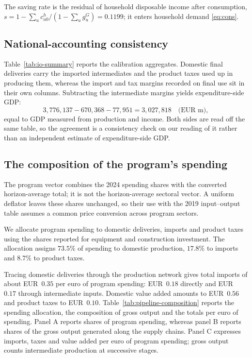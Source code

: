 {\setlength{\emergencystretch}{1.2em}%
The saving rate is the residual of household disposable income after consumption, $s=1-\sum_u c^{h}_{u0}/(1-\sum_u g^{G}_u)=0.1199$; it enters household demand \eqref{eq:cons}.\par}

\subsection{National-accounting consistency}\label{app:pipeline-checks}

Table~\ref{tab:io-summary} reports the calibration aggregates. Domestic final deliveries carry the imported intermediates and the product taxes used up in producing them, whereas the import and tax margins recorded on final use sit in their own columns. Subtracting the intermediate margins yields expenditure-side GDP:
\[
3{,}776{,}137 - 670{,}368 - 77{,}951 = 3{,}027{,}818
\quad\text{(EUR m)},
\]
equal to GDP measured from production and income. Both sides are read off the
same table, so the agreement is a consistency check on our reading of it rather
than an independent estimate of expenditure-side GDP.



\subsection{The composition of the program's spending}\label{app:pipeline-composition}

The program vector combines the 2024 spending shares with the converted horizon-average total; it is not the horizon-average sectoral vector. A uniform deflator leaves these shares unchanged, so their use with the 2019 input--output table assumes a common price conversion across program sectors.

We allocate program spending to domestic deliveries, imports and product taxes using the shares reported for equipment and construction investment. The allocation assigns $73.5\%$ of spending to domestic production, $17.8\%$ to imports and $8.7\%$ to product taxes.

Tracing domestic deliveries through the production network gives total imports of about EUR~$0.35$ per euro of program spending: EUR~$0.18$ directly and EUR~$0.17$ through intermediate inputs. Domestic value added amounts to EUR~$0.56$ and product taxes to EUR~$0.10$.
Table~\ref{tab:pipeline-composition} reports the spending allocation, the composition of gross output and the totals per euro of spending.
Panel A reports shares of program spending, whereas panel B reports shares of the gross output generated along the supply chains. Panel C expresses imports, taxes and value added per euro of program spending; gross output counts intermediate production at successive stages.

